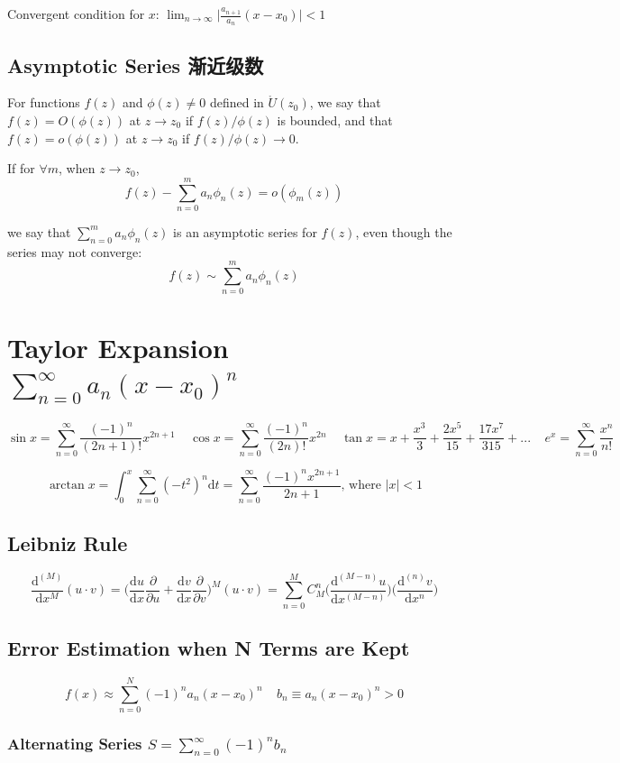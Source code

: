 \documentclass[10pt]{article}
\newcommand{\dd}{\mathrm{d}}
\begin{document}
Convergent condition for $x$:
$\lim_{n\to\infty} \big| \frac{a_{n+1}}{a_n} (x-x_0) \big| < 1$

\subsection{Asymptotic Series 渐近级数}

For functions $f(z)$ and $\phi(z)\neq 0$ defined in $\mathring{U}(z_0)$, we say that $f(z) = O(\phi(z))$ at $z\to z_0$ if $f(z)/\phi(z)$ is bounded, and that $f(z) = o(\phi(z))$ at $z\to z_0$ if $f(z)/\phi(z) \to 0$.

If for $\forall m$, when $z\to z_0$,
$$
f(z) - \sum_{n=0}^m a_n \phi_n(z) = o(\phi_m(z))
$$

we say that $\sum_{n=0}^m a_n \phi_n(z)$ is an asymptotic series for $f(z)$, even though the series may not converge:
$$
f(z) \sim \sum_{n=0}^m a_n \phi_n(z)
$$

\section[Taylor Expansion]{Taylor Expansion $\sum_{n=0}^\infty a_n (x-x_0)^n$}
$$
\sin x = \sum_{n=0}^\infty \frac{(-1)^n}{(2n+1)!} x^{2n+1}\ \ \ \ \ \cos x = \sum_{n=0}^\infty \frac{(-1)^n}{(2n)!} x^{2n}\ \ \ \ \ \tan x = x + \frac{x^3}{3} + \frac{2x^5}{15} + \frac{17x^7}{315} + ...\ \ \ \ \ e^{x} = \sum_{n=0}^\infty \frac{x^n}{n!}
$$

$$
\arctan x = \int_0^x \sum_{n=0}^\infty (-t^2)^n \dd t = \sum_{n=0}^\infty \frac{(-1)^n x^{2n+1}}{2n+1} \text{, where } |x| < 1
$$

\subsection{Leibniz Rule}
$$
\frac{\dd^{(M)}}{\dd x^M} (u\cdot v) = \bigg(\frac{\dd u}{\dd x}\frac{\partial}{\partial u} + \frac{\dd v}{\dd x}\frac{\partial}{\partial v}\bigg)^M (u\cdot v) = \sum_{n=0}^M C_M^n \bigg(\frac{\dd^{(M-n)} u}{\dd x^{(M-n)}}\bigg) \bigg(\frac{\dd^{(n)} v}{\dd x^n}\bigg)
$$

\subsection{Error Estimation when N Terms are Kept}
$$
f(x) \approx \sum_{n=0}^N (-1)^n a_n (x-x_0)^n\ \ \ \ \ b_n \equiv a_n(x-x_0)^n > 0
$$

\subsubsection[Alternating Series]{Alternating Series $S = \sum_{n=0}^\infty (-1)^n b_n$}
\end{document}
